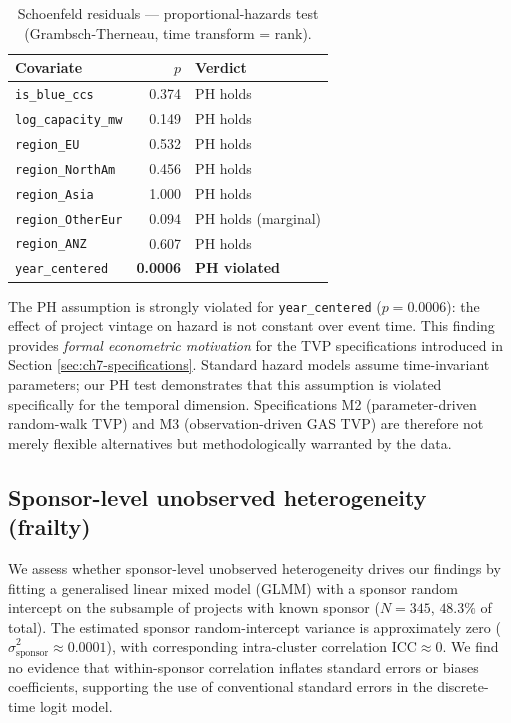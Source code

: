 \documentclass[11pt,a4paper]{article}
\begin{document}
\begin{table}[ht]
\centering
\caption{Schoenfeld residuals — proportional-hazards test (Grambsch-Therneau, time transform = rank).}
\label{tab:ch7-schoenfeld}
\begin{tabular}{lrl}
\toprule
Covariate & $p$ & Verdict \\
\midrule
\texttt{is\_blue\_ccs} & 0.374 & PH holds \\
\texttt{log\_capacity\_mw} & 0.149 & PH holds \\
\texttt{region\_EU} & 0.532 & PH holds \\
\texttt{region\_NorthAm} & 0.456 & PH holds \\
\texttt{region\_Asia} & 1.000 & PH holds \\
\texttt{region\_OtherEur} & 0.094 & PH holds (marginal) \\
\texttt{region\_ANZ} & 0.607 & PH holds \\
\texttt{year\_centered} & \textbf{0.0006} & \textbf{PH violated} \\
\bottomrule
\end{tabular}
\end{table}

The PH assumption is strongly violated for \texttt{year\_centered} ($p = 0.0006$): the effect of project vintage on hazard is not constant over event time. This finding provides \emph{formal econometric motivation} for the TVP specifications introduced in Section \ref{sec:ch7-specifications}. Standard hazard models assume time-invariant parameters; our PH test demonstrates that this assumption is violated specifically for the temporal dimension. Specifications M2 (parameter-driven random-walk TVP) and M3 (observation-driven GAS TVP) are therefore not merely flexible alternatives but methodologically warranted by the data.

\subsection{Sponsor-level unobserved heterogeneity (frailty)}

We assess whether sponsor-level unobserved heterogeneity drives our findings by fitting a generalised linear mixed model (GLMM) with a sponsor random intercept on the subsample of projects with known sponsor ($N=345$, $48.3\%$ of total). The estimated sponsor random-intercept variance is approximately zero ($\hat\sigma^2_{\mathrm{sponsor}} \approx 0.0001$), with corresponding intra-cluster correlation $\mathrm{ICC} \approx 0$. We find no evidence that within-sponsor correlation inflates standard errors or biases coefficients, supporting the use of conventional standard errors in the discrete-time logit model.
\end{document}
